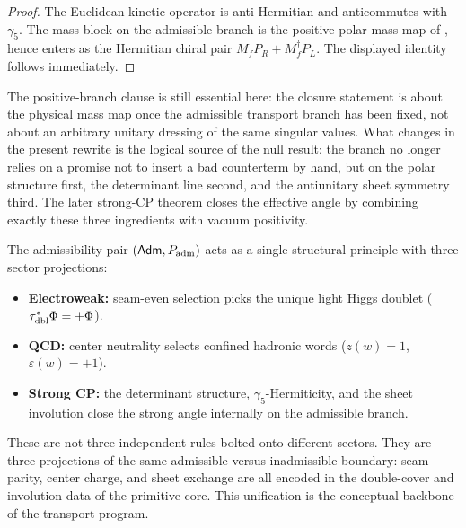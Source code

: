 \begin{proof}
The Euclidean kinetic operator is anti-Hermitian and anticommutes with $\gamma_5$. The mass block
on the admissible branch is the positive polar mass map of , hence
enters as the Hermitian chiral pair $M_fP_R+M_f^\dagger P_L$. The displayed identity follows
immediately.
\end{proof}

The positive-branch clause is still essential here: the closure statement is about the physical
mass map once the admissible transport branch has been fixed, not about an arbitrary unitary
dressing of the same singular values. What changes in the present rewrite is the logical source
of the null result: the branch no longer relies on a promise not to insert a bad counterterm by
hand, but on the polar structure first, the determinant line second, and the antiunitary sheet
symmetry third. The later strong-CP theorem closes the effective angle by combining exactly these
three ingredients with vacuum positivity.

\begin{remark}
The admissibility pair $(\mathsf{Adm},P_{\mathrm{adm}})$ acts as a single structural principle with three sector projections:
\begin{itemize}[leftmargin=1.5em, topsep=3pt, itemsep=2pt]
    \item \textbf{Electroweak:} seam-even selection picks the unique light Higgs doublet ($\tau_{\mathrm{dbl}}^{\ast}\Phi=+\Phi$).
    \item \textbf{QCD:} center neutrality selects confined hadronic words ($z(w)=1$, $\varepsilon(w)=+1$).
    \item \textbf{Strong CP:} the determinant structure, $\gamma_5$-Hermiticity, and the sheet involution close the strong angle internally on the admissible branch.
\end{itemize}
These are not three independent rules bolted onto different sectors. They are three projections of the same admissible-versus-inadmissible boundary: seam parity, center charge, and sheet exchange are all encoded in the double-cover and involution data of the primitive core. This unification is the conceptual backbone of the transport program.
\end{remark}


